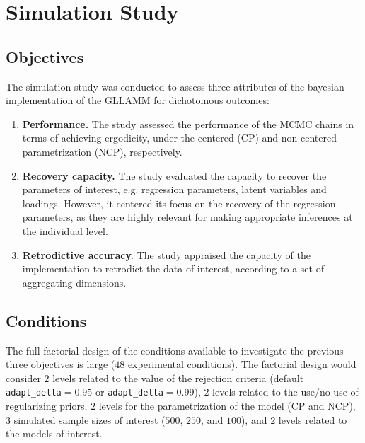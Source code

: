 \chapter{Simulation Study} \label{chap:simulation}

\section{Objectives} \label{sec:objectives}

The simulation study was conducted to assess three attributes of the bayesian implementation of the GLLAMM for dichotomous outcomes:
%
\begin{enumerate}
	\item \textbf{Performance.} The study assessed the performance of the MCMC chains in terms of achieving ergodicity, under the centered (CP) and non-centered parametrization (NCP), respectively.
	\item \textbf{Recovery capacity.} The study evaluated the capacity to recover the parameters of interest, e.g. regression parameters, latent variables and loadings. However, it centered its focus on the recovery of the regression parameters, as they are highly relevant for making appropriate inferences at the individual level.
	\item \textbf{Retrodictive accuracy.} The study appraised the capacity of the implementation to retrodict the data of interest, according to a set of aggregating dimensions.
\end{enumerate} 


\section{Conditions} \label{sec:conditions}

The full factorial design of the conditions available to investigate the previous three objectives is large ($48$ experimental conditions). The factorial design would consider $2$ levels related to the value of the rejection criteria (default \texttt{adapt\_delta}$=0.95$ or \texttt{adapt\_delta}$=0.99$), $2$ levels related to the use/no use of regularizing priors, $2$ levels for the parametrization of the model (CP and NCP), $3$ simulated sample sizes of interest ($500$, $250$, and $100$), and $2$ levels related to the models of interest.

